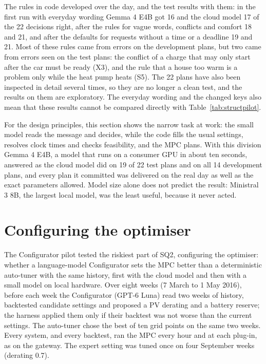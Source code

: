 \documentclass[12pt,a4paper]{report}
\begin{document}
The rules in code developed over the day, and the test results with
them: in the first run with everyday wording Gemma 4 E4B got 16 and the
cloud model 17 of the 22 decisions right, after the rules for vague
words, conflicts and comfort 18 and 21, and after the defaults for
requests without a time or a deadline 19 and 21. Most of these rules came from errors
on the development plans, but two came from errors seen on the test
plans: the conflict of a charge that may only start after the car must
be ready (X3), and the rule that a house too warm is a problem only
while the heat pump heats (S5). The 22 plans have also been inspected
in detail several times, so they are no longer a clean test, and the
results on them are exploratory.
The everyday wording and the changed keys also mean that these results
cannot be compared directly with Table~\ref{tab:structpilot}.

For the design principles, this section shows the narrow task at
work: the small model reads the message and decides, while the code
fills the usual settings, resolves clock times and checks feasibility,
and the MPC plans. With this division Gemma 4 E4B, a model that runs on
a consumer GPU in about ten seconds, answered as the cloud model did on
19 of 22 test plans and on all 14 development plans, and every plan it
committed was delivered on the real day as well as the exact parameters
allowed. Model size alone does not predict the result: Ministral 3 8B,
the largest local model, was the least useful, because it never acted.

\section{Configuring the optimiser}
\label{sec:configpilot}

The Configurator pilot tested the riskiest part of SQ2, configuring the
optimiser: whether a language-model Configurator sets the MPC better
than a deterministic auto-tuner with the same history, first with the
cloud model and then with a small model on local hardware. Over eight weeks (7 March to 1 May 2016), before each week
the Configurator (GPT-6 Luna) read two weeks of history, backtested
candidate settings and proposed a PV derating and a battery reserve; the
harness applied them only if their backtest was not worse than the
current settings. The auto-tuner chose the best of ten grid points on
the same two weeks. Every system, and every backtest, ran the MPC every
hour and at each plug-in, as on the gateway. The expert setting was
tuned once on four September weeks (derating 0.7).
\end{document}
